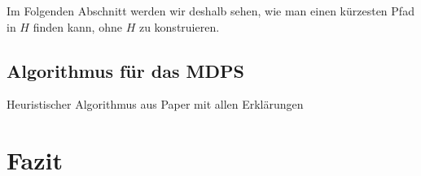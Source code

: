 \documentclass[11pt]{article}
\begin{document}
    Im Folgenden Abschnitt werden wir deshalb sehen, wie man einen kürzesten Pfad in $H$ finden kann, ohne $H$ zu konstruieren.
    
    \subsection{Algorithmus für das MDPS}
    \label{subsec:mdps}
    Heuristischer Algorithmus aus Paper mit allen Erklärungen

    \section{Fazit}
    \label{sec:fazit}

    
    
\end{document}
